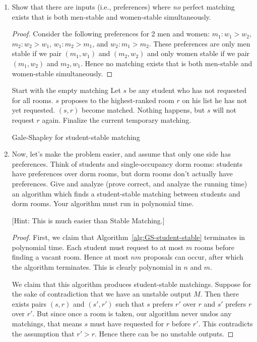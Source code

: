 \documentclass[10pt]{article}
\begin{document}
\begin{enumerate}
\item Show that there are inputs (i.e., preferences) where \emph{no} perfect matching exists that is both men-stable and women-stable simultaneously.

\begin{proof}
  Consider the following preferences for 2 men and women: \(m_1: w_1 > w_2\), \(m_2: w_2 > w_1\), \(w_1: m_2 > m_1\), and \(w_2: m_1 > m_2\). These preferences are only men stable if we pair \((m_1, w_1)\) and \((m_2, w_2)\) and only women stable if we pair \((m_1, w_2)\) and \(m_2, w_1\). Hence no matching exists that is both men-stable and women-stable simultaneously.
\end{proof}

\begin{algorithm}[htb]
  \begin{algorithmic}
    \STATE Start with the empty matching
      \STATE Let $s$ be any student who has not requested for all rooms.
      \STATE $s$ proposes to the highest-ranked room \(r\) on his list he has not yet requested.
        \STATE $(s,r)$ become matched.
      \ELSE
        \STATE Nothing happens, but $s$ will not request $r$ again.  
      \ENDIF
     \ENDWHILE
     \STATE Finalize the current temporary matching.
  \end{algorithmic}
\caption{Gale-Shapley for student-stable matching \label{alg:GS-student-stable}}
\end{algorithm}

\item Now, let's make the problem easier, and assume that only one side has preferences. Think of students and single-occupancy dorm rooms: students have preferences over dorm rooms, but dorm rooms don't actually have preferences.
  Give and analyze (prove correct, and analyze the running time) an algorithm which finds a student-stable matching between students and dorm rooms.
  Your algorithm must run in polynomial time.

  [Hint: This is much easier than Stable Matching.]

\begin{proof}
   First, we claim that Algorithm~\ref{alg:GS-student-stable} terminates in polynomial time. Each student must request to at most \(m\) rooms before finding a vacant room. Hence at most \(nm\) proposals can occur, after which the algorithm terminates. This is clearly polynomial in \(n\) and \(m\).

   We claim that this algorithm produces student-stable matchings. Suppose for the sake of contradiction that we have an unstable output \(M\). Then there exists pairs \((s, r)\) and \((s', r')\) such that \(s\) prefers \(r'\) over \(r\) and \(s'\) prefers \(r\) over \(r'\). But since once a room is taken, our algorithm never undos any matchings, that means \(s\) must have requested for \(r\) before \(r'\). This contradicts the assumption that \(r' > r\). Hence there can be no unstable outputs.
\end{proof}

\end{enumerate}
\end{document}
